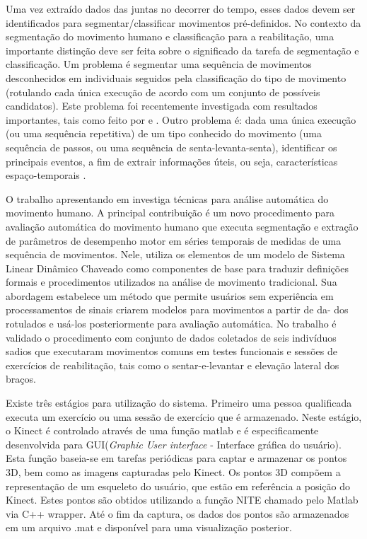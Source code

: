 Uma vez extraído dados das juntas no decorrer do tempo, esses dados devem ser identificados para segmentar/classificar movimentos pré-definidos.
  No contexto da segmentação do movimento humano e classificação para a reabilitação, 
uma importante distinção deve ser feita sobre o significado da tarefa de segmentação e classificação. 
Um problema é segmentar uma sequência de movimentos desconhecidos em 
individuais seguidos pela classificação do tipo de movimento (rotulando cada única
 execução de acordo com um conjunto de possíveis candidatos). 
Este problema foi recentemente investigada com resultados importantes, tais como 
feito por \cite{LinaAndDkulic} e \cite{PdeDios}. Outro problema é: dada uma única 
execução (ou uma sequência repetitiva) de um tipo conhecido do movimento
 (uma sequência de passos, ou uma sequência de senta-levanta-senta), identificar os principais eventos, 
a fim de extrair informações úteis, ou seja, características espaço-temporais \cite{roberto}.

O trabalho apresentando em \cite{roberto} investiga técnicas para análise automática
do movimento humano. A principal contribuição é um novo procedimento para avaliação
automática do movimento humano que executa segmentação e extração de parâmetros de
desempenho motor em séries temporais de medidas de uma sequência de movimentos. Nele,
utiliza os elementos de um modelo de Sistema Linear Dinâmico Chaveado como componentes
 de base para traduzir definições formais e procedimentos utilizados na análise de
movimento tradicional. Sua abordagem estabelece um método que permite usuários sem
experiência em processamentos de sinais criarem modelos para movimentos a partir de da-
dos rotulados e usá-los posteriormente para avaliação automática. No trabalho é validado o
procedimento com conjunto de dados coletados de seis indivíduos sadios que executaram
movimentos comuns em testes funcionais e sessões de exercícios de reabilitação, tais como
o sentar-e-levantar e elevação lateral dos braços.

Existe três estágios para utilização do sistema. Primeiro uma pessoa qualificada
executa um exercício ou uma sessão de exercício que é armazenado. Neste estágio,
o Kinect é controlado através de uma função matlab e é especificamente desenvolvida
para GUI(\textit{Graphic User interface} - Interface gráfica do usuário). Esta
função baseia-se em tarefas periódicas para captar e armazenar os pontos 3D, bem
como as imagens capturadas pelo Kinect. Os pontos 3D compõem a representação de
um esqueleto do usuário, que estão em referência a posição do Kinect. Estes pontos
são obtidos utilizando a função NITE \cite{openNI} chamado pelo Matlab via C++
wrapper. Até o fim da captura, os dados dos pontos são armazenados em um arquivo
.mat e disponível para uma visualização posterior.

